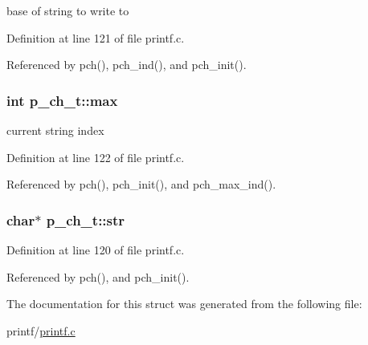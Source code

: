 base of string to write to 



Definition at line 121 of file printf.\+c.



Referenced by pch(), pch\+\_\+ind(), and pch\+\_\+init().

\subsubsection[{\texorpdfstring{max}{max}}]{\setlength{\rightskip}{0pt plus 5cm}int p\+\_\+ch\+\_\+t\+::max}\hypertarget{structp__ch__t_a0dee9f28e498d427e53051b7e1846d34}{}\label{structp__ch__t_a0dee9f28e498d427e53051b7e1846d34}


current string index 



Definition at line 122 of file printf.\+c.



Referenced by pch(), pch\+\_\+init(), and pch\+\_\+max\+\_\+ind().

\subsubsection[{\texorpdfstring{str}{str}}]{\setlength{\rightskip}{0pt plus 5cm}char$\ast$ p\+\_\+ch\+\_\+t\+::str}\hypertarget{structp__ch__t_aa3c8616342a2717bc714bf1b6d00516f}{}\label{structp__ch__t_aa3c8616342a2717bc714bf1b6d00516f}


Definition at line 120 of file printf.\+c.



Referenced by pch(), and pch\+\_\+init().



The documentation for this struct was generated from the following file\+:\begin{DoxyCompactItemize}
\item 
printf/\hyperlink{printf_8c}{printf.\+c}\end{DoxyCompactItemize}
